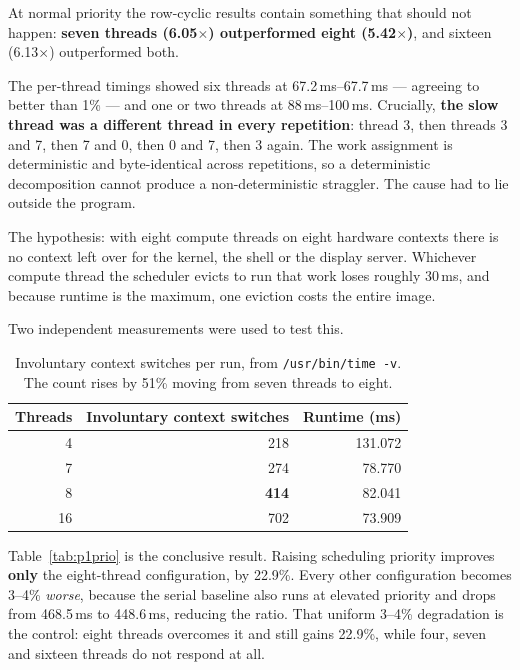 \documentclass[11pt,a4paper]{article}
\newcommand{\ms}[1]{#1\,ms}
\begin{document}
At normal priority the row-cyclic results contain something that should not
happen: \textbf{seven threads (6.05$\times$) outperformed eight
(5.42$\times$)}, and sixteen (6.13$\times$) outperformed both.

The per-thread timings showed six threads at \ms{67.2}--\ms{67.7} --- agreeing
to better than 1\% --- and one or two threads at \ms{88}--\ms{100}. Crucially,
\textbf{the slow thread was a different thread in every repetition}: thread 3,
then threads 3 and 7, then 7 and 0, then 0 and 7, then 3 again. The work
assignment is deterministic and byte-identical across repetitions, so a
deterministic decomposition cannot produce a non-deterministic straggler. The
cause had to lie outside the program.

The hypothesis: with eight compute threads on eight hardware contexts there is
no context left over for the kernel, the shell or the display server. Whichever
compute thread the scheduler evicts to run that work loses roughly \ms{30},
and because runtime is the maximum, one eviction costs the entire image.

Two independent measurements were used to test this.

\begin{table}[H]
\centering
\begin{tabular}{r rr}
\toprule
Threads & Involuntary context switches & Runtime (ms) \\
\midrule
4  & 218 & 131.072 \\
7  & 274 & 78.770 \\
8  & \textbf{414} & 82.041 \\
16 & 702 & 73.909 \\
\bottomrule
\end{tabular}
\caption{Involuntary context switches per run, from \texttt{/usr/bin/time -v}.
         The count rises by 51\% moving from seven threads to eight.}
\label{tab:p1cs}
\end{table}

\begin{table}[H]
\centering
\progOnePriority
\caption{View 1, row-cyclic: speedup at normal priority versus
         \texttt{nice -20}. $\star$ marks the only configuration that
         improves.}
\label{tab:p1prio}
\end{table}

Table~\ref{tab:p1prio} is the conclusive result. Raising scheduling priority
improves \textbf{only} the eight-thread configuration, by 22.9\%. Every other
configuration becomes 3--4\% \emph{worse}, because the serial baseline also
runs at elevated priority and drops from \ms{468.5} to \ms{448.6}, reducing
the ratio. That uniform 3--4\% degradation is the control: eight threads
overcomes it and still gains 22.9\%, while four, seven and sixteen threads do
not respond at all.
\end{document}
